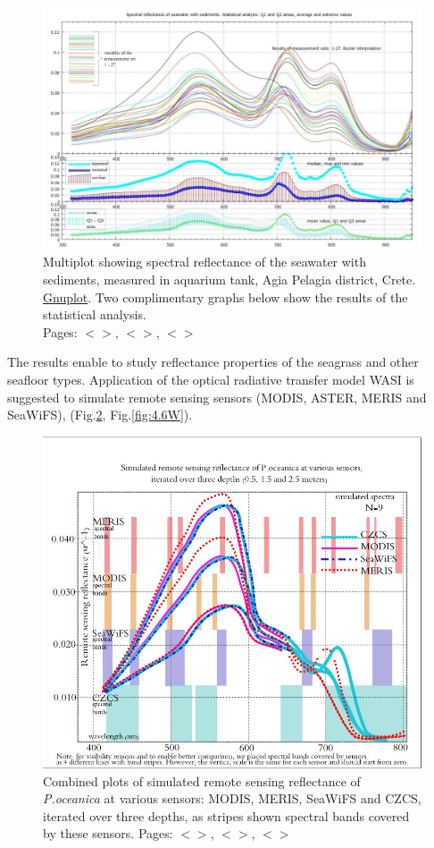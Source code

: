 \documentclass[11pt]{article}
\begin{document}
\begin{figure}[H]
	\centering
	\includegraphics[scale=0.35]{GNU-18-legend.png}
	\caption{Multiplot showing spectral reflectance of the seawater with sediments, measured in aquarium tank, Agia Pelagia district, Crete. \href{http://www.gnuplot.info/}{Gnuplot}. Two complimentary graphs below show the results of the statistical analysis.\\ Pages: $<$\pageref{page-28}$>$, $<$\pageref{dataprep}$>$, $<$\pageref{page-31}$>$}
	\label{fig:4.4}
\end{figure}

The results enable to study reflectance properties of the seagrass and other
seafloor types. Application of the optical radiative transfer model WASI is suggested to simulate
remote sensing sensors (\ac{MODIS}, \ac{ASTER}, \ac{MERIS} and \ac{SeaWiFS}), (Fig.\ref{fig:4.6}, Fig.\ref{fig:4.6W}).\label{page-33}

\begin{figure}[H]
	\centering
	\includegraphics[scale=0.5]{Sensors.jpg}
	\caption{Combined plots of simulated remote sensing reflectance of \textit{P.oceanica} at various sensors: \ac{MODIS}, \ac{MERIS}, \ac{SeaWiFS} and \ac{CZCS}, iterated over three depths, as stripes shown spectral bands covered by these sensors. Pages: $<$\pageref{page-21}$>$, $<$\pageref{page-22}$>$, $<$\pageref{page-33}$>$}
	\label{fig:4.6}
\end{figure}
\end{document}
